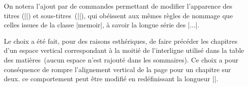 \begin{developer}
On notera l'ajout par \frenchlaw de commandes permettant de modifier l'apparence des titres (|\heading|) et sous-titres~(|\subheading|), qui obéissent aux mêmes règles de nommage que celles issues de la classe |memoir|, à savoir la longue série des |\cft...|.
\end{developer}

\begin{noprint}
\renewcommand{\cftheadingaftersnum}{.}
\renewcommand{\cftheadingaftersnumb}{\mdseries\defaultcolour}
\renewcommand{\cftheadingfont}{\if@modern\sffamily\if@colourall\maincolour\fi\fi\large\bfseries}
\renewcommand{\cftheadingleader}{\hfill}
\setlength{\cftbeforeheadingskip}{\baselineskip}
\end{noprint}

\begin{noprint}
\renewcommand{\cftsubheadingaftersnum}{.}
\renewcommand{\cftsubheadingaftersnumb}{\mdseries\defaultcolour}
\renewcommand{\cftsubheadingfont}{\if@modern\sffamily\if@colourall\maincolour\fi\fi\bfseries}
\renewcommand{\cftsubheadingleader}{\hfill}
\setlength{\cftbeforesubheadingskip}{\baselineskip}
\end{noprint}

Le choix a été fait, pour des raisons esthériques, de faire précéder les chapitres d'un espace vertical correspondant à la moitié de l'interligne utilisé dans la table des matières~(aucun espace n'est rajouté dans les sommaires). Ce choix a pour conséquence de rompre l'alignement vertical de la page pour un chapitre sur deux. ce comportement peut être modifié en redéfinissant la longueur |\cftbeforechapterskip|\label{grid:cftbeforechapterskip}.

\begin{noprint}
\renewcommand*{\cftchapteraftersnum}{.}
\renewcommand*{\cftchapteraftersnumb}{\mdseries\defaultcolour}
\renewcommand{\cftchapterfont}{\if@modern\sffamily\if@colourall\maincolour\fi\fi\bfseries}
\renewcommand*{\cftchapterpagefont}{\normalsize}
\setlength{\cftbeforechapterskip}{\if@modern\baselineskip\else.5\baselineskip\fi}
\end{noprint}

\begin{noprint}
\renewcommand*{\cftsectionaftersnum}{.}
\renewcommand*{\cftsectionaftersnumb}{\mdseries\defaultcolour}
\renewcommand*{\cftsectionfont}{\if@modern\sffamily\if@colourall\maincolour\fi\fi\bfseries}
\setlength{\cftbeforesectionskip}{\z@}
\end{noprint}

